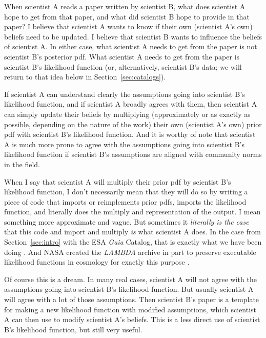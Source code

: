 \documentclass{article}
\newcommand{\sectionname}{Section}
\newcommand{\secref}[1]{\sectionname~\ref{#1}}
\begin{document}
When scientist A reads a paper written by scientist B, what does scientist A hope to get from that paper, and what did scientist B hope to provide in that paper?
I believe that scientist A wants to know if their own (scientist A's own) beliefs need to be updated.
I believe that scientist B wants to influence the beliefs of scientist A.
In either case, what scientist A needs to get from the paper is not scientist B's posterior pdf.
What scientist A needs to get from the paper is scientist B's likelihood function (or, alternatively, scientist B's data; we will return to that idea below in \secref{sec:catalogs}).

If scientist A can understand clearly the assumptions going into scientist B's likelihood function,
and if scientist A broadly agrees with them,
then scientist A can simply update their beliefs by multiplying (approximately or as exactly as possible, depending on the nature of the work)
their own (scientist A's own) prior pdf with scientist B's likelihood function.
And it is worthy of note that scientist A is much more prone to agree with the assumptions going into scientist B's likelihood function if scientist B's assumptions are aligned with community norms in the field.

When I say that scientist A will multiply their prior pdf by scientist B's likelihood function,
I don't necessarily mean that they will do so by writing a piece of code that imports or reimplements prior pdfs, imports the likelihood function, and literally does the multiply and representation of the output.
I mean something more approximate and vague.
But sometimes it \emph{literally is the case} that this code and import and multiply \emph{is} what scientist A does.
In the case from \secref{sec:intro} with the ESA \textsl{Gaia} Catalog, that is exactly what we have been doing \cite{gaialf}.
And NASA created the \textsl{LAMBDA} archive in part to preserve executable likelihood functions in cosmology for exactly this purpose \cite{lambda}.

Of course this is a dream.
In many real cases, scientist A will not agree with the assumptions going into scientist B's likelihood function.
But usually scientist A will agree with a lot of those assumptions.
Then scientist B's paper is a template for making a new likelihood function with modified assumptions, which scientist A can then use to modify scientist A's beliefs.
This is a less direct use of scientist B's likelihood function, but still very useful.
\end{document}
